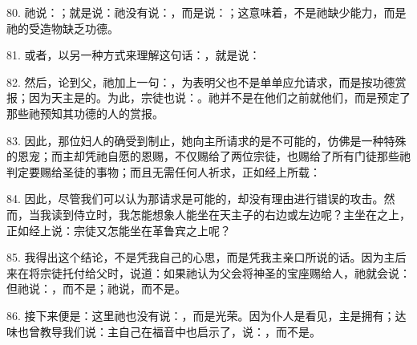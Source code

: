 80. 祂说：；就是说：祂没有说：，而是说：；这意味着，不是祂缺少能力，而是祂的受造物缺乏功德。\par

81. 或者，以另一种方式来理解这句话：，就是说：\par

82. 然后，论到父，祂加上一句：，为表明父也不是单单应允请求，而是按功德赏报；因为天主是的。为此，宗徒也说：。祂并不是在他们之前就他们，而是预定了那些祂预知其功德的人的赏报。\par

83. 因此，那位妇人的确受到制止，她向主所请求的是不可能的，仿佛是一种特殊的恩宠；而主却凭祂自愿的恩赐，不仅赐给了两位宗徒，也赐给了所有门徒那些祂判定要赐给圣徒的事物；而且无需任何人祈求，正如经上所载：\par

84. 因此，尽管我们可以认为那请求是可能的，却没有理由进行错误的攻击。然而，当我读到侍立时，我怎能想象人能坐在天主子的右边或左边呢？主坐在之上，正如经上说：宗徒又怎能坐在革鲁宾之上呢？\par

85. 我得出这个结论，不是凭我自己的心思，而是凭我主亲口所说的话。因为主后来在将宗徒托付给父时，说道：如果祂认为父会将神圣的宝座赐给人，祂就会说：但祂说：，而不是；祂说，而不是。\par

86. 接下来便是：这里祂也没有说：，而是光荣。因为仆人是看见，主是拥有；达味也曾教导我们说：主自己在福音中也启示了，说：，而不是。\par

